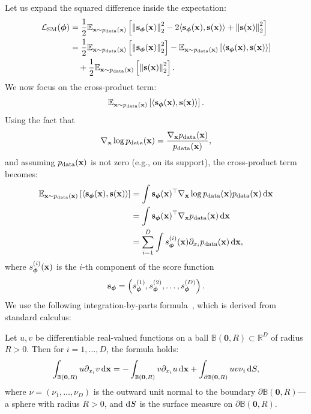         Let us expand the squared difference inside the expectation:
        \begin{align*}
        \mathcal{L}_{\text{SM}}(\bm{\phi}) &= \frac{1}{2}\mathbb{E}_{{\mathbf{x}} \sim p_{\text{data}}({\mathbf{x}})} \left[ \left\lVert{\mathbf{s}}_{\bm{\phi}}({\mathbf{x}})\right\rVert_2^2 - 2 \langle {\mathbf{s}}_{\bm{\phi}}({\mathbf{x}}), {\mathbf{s}}({\mathbf{x}}) \rangle + \left\lVert{\mathbf{s}}({\mathbf{x}})\right\rVert_2^2 \right] \\
        &= \frac{1}{2}\mathbb{E}_{{\mathbf{x}} \sim p_{\text{data}}({\mathbf{x}})} \left[ \left\lVert{\mathbf{s}}_{\bm{\phi}}({\mathbf{x}})\right\rVert_2^2 \right] - \mathbb{E}_{{\mathbf{x}} \sim p_{\text{data}}({\mathbf{x}})} \left[ \langle {\mathbf{s}}_{\bm{\phi}}({\mathbf{x}}), {\mathbf{s}}({\mathbf{x}}) \rangle \right] \\
        &\quad + \frac{1}{2}\mathbb{E}_{{\mathbf{x}} \sim p_{\text{data}}({\mathbf{x}})} \left[ \left\lVert{\mathbf{s}}({\mathbf{x}})\right\rVert_2^2 \right].
        \end{align*}
        We now focus on the cross-product term:
        \[
        \mathbb{E}_{{\mathbf{x}} \sim p_{\text{data}}({\mathbf{x}})} \left[ \langle {\mathbf{s}}_{\bm{\phi}}({\mathbf{x}}), {\mathbf{s}}({\mathbf{x}}) \rangle \right].
        \]
        Using the fact that
        \[
        \nabla_{{\mathbf{x}}} \log p_{\text{data}}({\mathbf{x}}) = \frac{\nabla_{{\mathbf{x}}}p_{\text{data}}({\mathbf{x}})}{p_{\text{data}}({\mathbf{x}})},
        \]
        and assuming $p_{\text{data}}({\mathbf{x}})$ is not zero (e.g., on its support), the cross-product term becomes:
        \begin{align*}
            \mathbb{E}_{{\mathbf{x}} \sim p_{\text{data}}({\mathbf{x}})} \left[ \langle {\mathbf{s}}_{\bm{\phi}}({\mathbf{x}}), {\mathbf{s}}({\mathbf{x}}) \rangle \right] 
             &= \int {\mathbf{s}}_{\bm{\phi}}({\mathbf{x}})^\top  \nabla_{{\mathbf{x}}} \log p_{\text{data}}({\mathbf{x}}) p_{\text{data}}({\mathbf{x}}) \mathop{}\!\mathrm{d} {\mathbf{x}} \\
             &= \int {\mathbf{s}}_{\bm{\phi}}({\mathbf{x}})^\top  \nabla_{{\mathbf{x}}}p_{\text{data}}({\mathbf{x}}) \mathop{}\!\mathrm{d} {\mathbf{x}} \\
             &= \sum_{i=1}^{D} \int  s_{\bm{\phi}}^{(i)}({\mathbf{x}}) \partial_{x_i}p_{\text{data}}({\mathbf{x}}) \mathop{}\!\mathrm{d} {\mathbf{x}},
        \end{align*}
        where $s_{\bm{\phi}}^{(i)}({\mathbf{x}})$ is the $i$-th component of the score function 
        \[
        {\mathbf{s}}_{\bm{\phi}} = \left( s_{\bm{\phi}}^{(1)}, s_{\bm{\phi}}^{(2)}, \dots, s_{\bm{\phi}}^{(D)} \right).
        \]
        We use the following integration-by-parts formula~\citep{evans10}, which is derived from standard calculus:
        \begin{lemma*}
            Let $u, v$ be differentiable real-valued functions on a ball $\mathbb{B}(\bm{0}, R) \subset \mathbb{R}^D$ of radius $R>0$. Then for $i = 1, \ldots, D$, the formula holds:
        \[
        \int_{\mathbb{B}(\bm{0}, R)} u   \partial_{x_i} v   \mathop{}\!\mathrm{d} {\mathbf{x}} = -\int_{\mathbb{B}(\bm{0}, R)} v   \partial_{x_i} u   \mathop{}\!\mathrm{d} {\mathbf{x}} + \int_{\partial \mathbb{B}(\bm{0}, R)} u v \nu_i   \mathop{}\!\mathrm{d} S,
        \]
        where $\nu = (\nu_1, \ldots, \nu_D)$ is the outward unit normal to the boundary $\partial \mathbb{B}(\bm{0}, R)$---a sphere with radius $R>0$, and $\mathop{}\!\mathrm{d} S$ is the surface measure on $\partial \mathbb{B}(\bm{0}, R)$.
        \end{lemma*}
